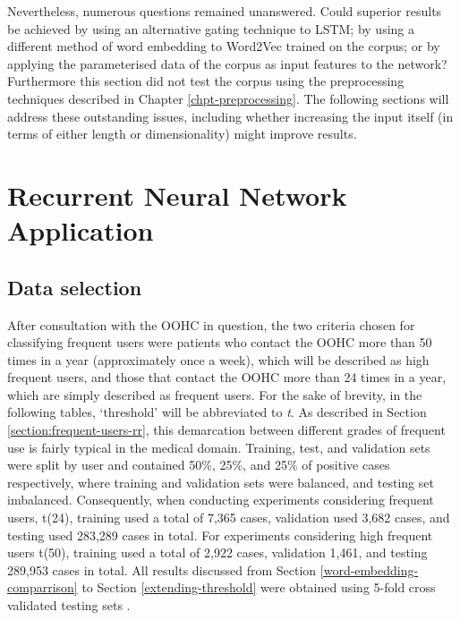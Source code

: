 Nevertheless, numerous questions remained unanswered. Could superior results be achieved by using an alternative gating technique to LSTM; by using a different method of word embedding to Word2Vec trained on the corpus; or by applying the parameterised data of the corpus as input features to the network? Furthermore this section did not test the corpus using the preprocessing techniques described in Chapter \ref{chpt-preprocessing}. The following sections will address these outstanding issues, including whether increasing the input itself (in terms of either length or dimensionality) might improve results.  



\section{Recurrent Neural Network Application}
\label{RNNA}

\subsection{Data selection}
\label{testing-methodologies}

After consultation with the OOHC in question, the two criteria chosen for classifying frequent users were patients who contact the OOHC more than 50 times in a year (approximately once a week), which will be described as high frequent users, and those that contact the OOHC more than 24 times in a year, which are simply described as frequent users. For the sake of brevity, in the following tables, `threshold' will be abbreviated to \textit{t}. As described in Section \ref{section:frequent-users-rr}, this demarcation between different grades of frequent use is fairly typical in the medical domain. Training, test, and validation sets were split by user and contained 50\%, 25\%, and 25\% of positive cases respectively, where training and validation sets were balanced, and testing set imbalanced. Consequently, when conducting experiments considering frequent users, t(24), training used a total of 7,365 cases, validation used 3,682 cases, and testing used 283,289 cases in total. For experiments considering high frequent users t(50), training used a total of 2,922 cases, validation 1,461, and testing 289,953 cases in total. All results discussed from Section \ref{word-embedding-comparrison} to Section \ref{extending-threshold} were obtained using 5-fold cross validated testing sets \cite{arlot2010survey}.    

